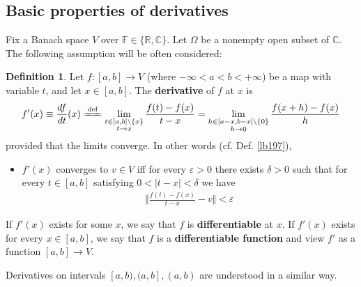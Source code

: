 \documentclass[12pt,b5paper,notitlepage]{article}
\theoremstyle{definition}
\newtheorem{df}{Definition}[section]
\theoremstyle{plain}
\newcommand{\Cbb}{\mathbb C}
\newcommand{\Rbb}{\mathbb R}
\newcommand{\Fbb}{\mathbb F}
\newcommand{\eps}{\varepsilon}
\numberwithin{equation}{section}
\begin{document}
\subsection{Basic properties of derivatives}\label{lb575}


Fix a Banach space $V$ over $\Fbb\in\{\Rbb,\Cbb\}$. Let $\Omega$ be a nonempty open subset of $\Cbb$. The following assumption will be often considered:




\begin{df}
Let $f:[a,b]\rightarrow V$ (where  $-\infty<a<b<+\infty$)  be a map with variable $t$, and let $x\in[a,b]$. The \textbf{derivative}  of $f$ at $x$ is
\begin{align*}
f'(x)\equiv \frac{df}{dt}(x)\xlongequal{\mathrm{def}}\lim_{
\begin{subarray}{c}
t\in[a,b]\setminus\{x\}\\
t\rightarrow x
\end{subarray}
}
\frac{f(t)-f(x)}{t-x}
=\lim_{
\begin{subarray}{c}
h\in [a-x,b-x]\setminus\{0\}\\
h\rightarrow 0
\end{subarray}
}
\frac{f(x+h)-f(x)}h
\end{align*}
provided that the limits converge. In other words (cf. Def. \ref{lb197}),
\begin{itemize}
\item $f'(x)$ converges to $v\in V$ iff for every $\eps>0$ there exists $\delta>0$ such that for every $t\in[a,b]$ satisfying $0<|t-x|<\delta$ we have
\begin{align*}
\Big\Vert \frac{f(t)-f(x)}{t-x}-v  \Big\Vert<\eps
\end{align*}
\end{itemize}


If $f'(x)$ exists for some $x$, we say that $f$ is \textbf{differentiable}  at $x$. If $f'(x)$ exists for  every $x\in [a,b]$, we say that $f$ is a \textbf{differentiable function} and view $f'$ as a function $[a,b]\rightarrow V$. 

Derivatives on intervals $[a,b),(a,b],(a,b)$ are understood in a similar way. \hfill\qedsymbol
\end{df}
\end{document}
